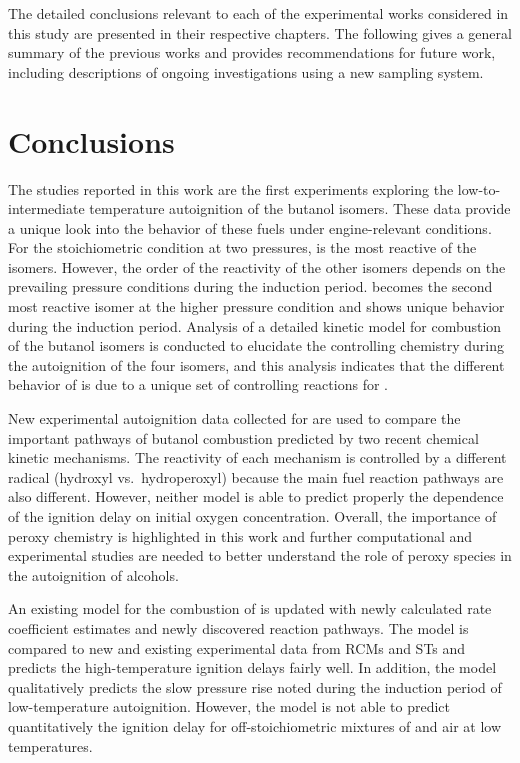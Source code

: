 \documentclass[../main.tex]{subfiles}
\begin{document}
The detailed conclusions relevant to each of the experimental works
considered in this study are presented in their respective chapters.
The following gives a general summary of the previous works and provides
recommendations for future work, including descriptions of ongoing
investigations using a new sampling system.

\section{Conclusions}
\label{sec:overall-conclusions}
The studies reported in this work are the first experiments exploring
the low-to-intermediate temperature autoignition of the butanol isomers.
These data provide a unique look into the behavior of these fuels under
engine-relevant conditions. For the stoichiometric condition at two
pressures, \nBuOH{} is the most reactive of the isomers. However, the
order of the reactivity of the other isomers depends on the prevailing
pressure conditions during the induction period. \tBuOH{} becomes the
second most reactive isomer at the higher pressure condition and shows
unique behavior during the induction period. Analysis of a detailed
kinetic model for combustion of the butanol isomers is conducted to elucidate
the controlling chemistry during the autoignition of the four isomers,
and this analysis indicates that the different behavior of \tBuOH{} is
due to a unique set of controlling reactions for \tBuOH{}.

New experimental autoignition data collected for \iBuOH{} are used to
compare the important pathways of butanol combustion predicted by two
recent chemical kinetic mechanisms. The reactivity of each mechanism is
controlled by a different radical (hydroxyl vs.\ hydroperoxyl) because the
main fuel reaction pathways are also different. However, neither model
is able to predict properly the dependence of the ignition delay on initial
oxygen concentration. Overall, the importance of peroxy chemistry is
highlighted in this work and further computational and experimental
studies are needed to better understand the role of peroxy species in
the autoignition of alcohols.

An existing model for the combustion of \iPeOH{} is updated with newly
calculated rate coefficient estimates and newly discovered reaction
pathways. The model is compared to new and existing experimental data
from RCMs and STs and predicts the high-temperature ignition delays
fairly well. In addition, the model qualitatively predicts the slow
pressure rise noted during the induction period of low-temperature
autoignition. However, the model is not able to predict quantitatively
the ignition delay for off-stoichiometric mixtures of \iPeOH{} and air
at low temperatures.
\end{document}
